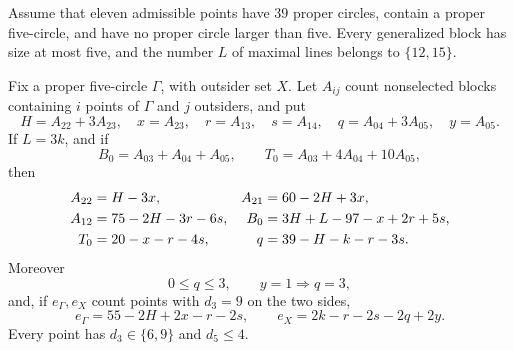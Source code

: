 \begin{lemma}[The \(C=39\) arithmetic front]\label{lem:n11-C39-front-v2}
Assume that eleven admissible points have \(39\) proper circles, contain a
proper five-circle, and have no proper circle larger than five.  Every
generalized block has size at most five, and the number \(L\) of maximal
lines belongs to \(\{12,15\}\).

Fix a proper five-circle \(\Gamma\), with outsider set \(X\).  Let \(A_{ij}\)
count nonselected blocks containing \(i\) points of \(\Gamma\) and \(j\)
outsiders, and put
\[
 H=A_{22}+3A_{23},\quad x=A_{23},\quad
 r=A_{13},\quad s=A_{14},\quad
 q=A_{04}+3A_{05},\quad y=A_{05}.
\]
If \(L=3k\), and if
\[
 B_0=A_{03}+A_{04}+A_{05},\qquad
 T_0=A_{03}+4A_{04}+10A_{05},
\]
then
\begin{align}
A_{22}&=H-3x,&A_{21}&=60-2H+3x,\notag\\
A_{12}&=75-2H-3r-6s,&
B_0&=3H+L-97-x+2r+5s,\notag\\
T_0&=20-x-r-4s,&
q&=39-H-k-r-3s. \label{eq:C39-full-front-v2}
\end{align}
Moreover
\begin{equation}\label{eq:C39-rich-cap-v2}
 0\le q\le3,\qquad y=1\Longrightarrow q=3,
\end{equation}
and, if \(e_\Gamma,e_X\) count points with \(d_3=9\) on the two sides,
\begin{equation}\label{eq:C39-high-split-v2}
 e_\Gamma=55-2H+2x-r-2s,\qquad
 e_X=2k-r-2s-2q+2y.
\end{equation}
Every point has \(d_3\in\{6,9\}\) and \(d_5\le4\).
\end{lemma}

